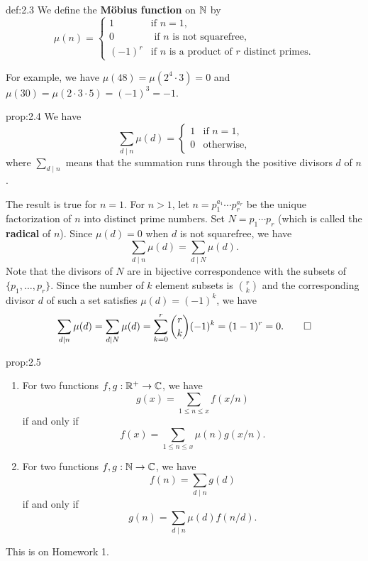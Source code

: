 \begin{defn}{def:2.3}
We define the {\bf M\"obius function} on $\mathbb{N}$ by 
\[ \mu(n) = \begin{cases} 1 & \text{if } n = 1, \\ 0 & \text{ if $n$ is not squarefree,} \\ 
(-1)^r & \text{if $n$ is a product of $r$ distinct primes.} \end{cases} \]
\end{defn}
For example, we have $\mu(48) = \mu(2^4 \cdot 3) = 0$ and $\mu(30) = \mu(2 \cdot 3 \cdot 5) = 
(-1)^3 = -1$. 

\begin{prop}{prop:2.4}
We have 
\[ \sum_{d \mid n} \mu(d) = \begin{cases} 1 & \text{if } n = 1, \\ 0 & \text{otherwise,} \end{cases} \]
where $\sum_{d\mid n}$ means that the summation runs through the positive divisors $d$ of $n$. 
\end{prop}
\begin{pf}
The result is true for $n = 1$. For $n > 1$, let $n = p_1^{a_1} \cdots p_r^{a_r}$ be the unique 
factorization of $n$ into distinct prime numbers. Set $N = p_1 \cdots p_r$ (which is called the 
{\bf radical} of $n$). Since $\mu(d) = 0$ when $d$ is not squarefree, we have 
\[ \sum_{d\mid n} \mu(d) = \sum_{d\mid N} \mu(d). \]
Note that the divisors of $N$ are in bijective correspondence with the subsets of $\{p_1, \dots, p_r\}$. 
Since the number of $k$ element subsets is $\binom{r}{k}$ and the corresponding divisor $d$ of such 
a set satisfies $\mu(d) = (-1)^k$, we have 
\[ \sum_{d \mid n} \mu(d) = \sum_{d \mid N} \mu(d) = \sum_{k=0}^r \binom rk (-1)^k = (1-1)^r = 0. \qedhere \]
\end{pf}

\begin{prop}{prop:2.5}
\begin{enumerate}[(1)]
    \item For two functions $f, g : \mathbb{R}^+ \to \mathbb{C}$, we have 
    \[ g(x) = \sum_{1 \leq n \leq x} f(x/n) \]
    if and only if 
    \[ f(x) = \sum_{1 \leq n \leq x} \mu(n) g(x/n). \]
    \item For two functions $f, g : \mathbb{N} \to \mathbb{C}$, we have 
    \[ f(n) = \sum_{d \mid n} g(d) \]
    if and only if 
    \[ g(n) = \sum_{d \mid n} \mu(d) f(n/d). \]
\end{enumerate}
\end{prop}
\begin{pf}
This is on Homework 1.
\end{pf}

